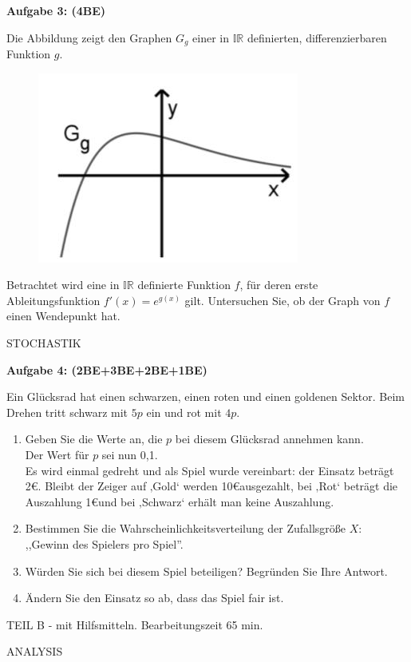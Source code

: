 \documentclass[a4paper,12pt]{article}
\newcommand{\Aufgabe}[1]{
  {
  \vspace*{0.5cm}
  \textsf{\textbf{Aufgabe #1}}
  \vspace*{0.2cm}
  
  }
}
\begin{document}
\Aufgabe{3: (4BE)}
Die Abbildung zeigt den Graphen $G_g$ einer in $\mathbb{IR}$ definierten, differenzierbaren Funktion $g$.

  \begin{figure}[H]
    \vspace{0cm}
    \centering
    \includegraphics[width=0.3\linewidth]{Q12_SA_240103_4.jpg}
  \end{figure}

Betrachtet wird eine in $\mathbb{IR}$ definierte Funktion $f$, für deren erste Ableitungsfunktion $f'(x) = e^{g(x)}$ gilt.
Untersuchen Sie, ob der Graph von $f$ einen Wendepunkt hat.


\vspace{1cm}
STOCHASTIK



\Aufgabe{4: (2BE+3BE+2BE+1BE)}
Ein Glücksrad hat einen schwarzen, einen roten und einen goldenen Sektor. Beim Drehen tritt schwarz mit $5p$ ein und rot mit $4p$.
\begin{enumerate}[label={\alph*)}]
  \item Geben Sie die Werte an, die $p$ bei diesem Glücksrad annehmen kann.\\

  Der Wert für $p$ sei nun 0,1. \\
  Es wird einmal gedreht und als Spiel wurde vereinbart: der Einsatz beträgt 2\euro. Bleibt der Zeiger auf ‚Gold‘ werden 10\euro ausgezahlt, bei ‚Rot‘ beträgt die Auszahlung 1\euro und bei ‚Schwarz‘ erhält man keine Auszahlung.
\item Bestimmen Sie die Wahrscheinlichkeitsverteilung der Zufallsgröße $X:$ ,,Gewinn des Spielers pro Spiel''.
\item Würden Sie sich bei diesem Spiel beteiligen? Begründen Sie Ihre Antwort.
\item Ändern Sie den Einsatz so ab, dass das Spiel fair ist.
\end{enumerate}


\newpage
\vspace{1,5cm} {TEIL B} - mit Hilfsmitteln. Bearbeitungszeit 65 min.
\vspace {0,2cm}

ANALYSIS
\end{document}
